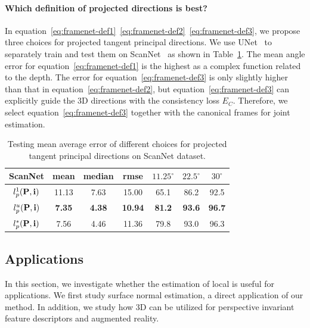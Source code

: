 \vspace{-0.1in}
\paragraph{Which definition of projected directions is best?}
In equation~\ref{eq:framenet-def1}~\ref{eq:framenet-def2}~\ref{eq:framenet-def3}, we propose three choices for projected tangent principal directions. We use UNet~\cite{ronneberger2015u} to separately train and test them on ScanNet~\cite{dai2017scannet} as shown in Table~\ref{tab:framenet-def}. The mean angle error for equation~\ref{eq:framenet-def1} is the highest as a complex function related to the depth. The error for equation~\ref{eq:framenet-def3} is only slightly higher than that in equation~\ref{eq:framenet-def2}, but equation~\ref{eq:framenet-def3} can explicitly guide the 3D directions with the consistency loss $E_C$. Therefore, we select equation~\ref{eq:framenet-def3} together with the canonical frames for joint estimation.

\begin{table}[t]
    \centering
    \tabcolsep=0.13cm
    \small
    \begin{tabular}{|c|c|c|c||c|c|c|}
        \hline
         \textbf{ScanNet} & mean & median & rmse & $11.25^\circ$ & $22.5^\circ$ & $30^\circ$\\
         \hline
         $l^1_p(\mathbf{P},\mathbf{i})$ & 11.13 & 7.63 & 15.00 & 65.1 & 86.2 & 92.5\\
         \hline
         $l^u_p(\mathbf{P},\mathbf{i})$ & \textbf{7.35} & \textbf{4.38} & \textbf{10.94} & \textbf{81.2} & \textbf{93.6} & \textbf{96.7}\\
         \hline
         $l^*_p(\mathbf{P},\mathbf{i})$ & 7.56 & 4.46 & 11.36 & 79.8 & 93.0 & 96.3\\
         \hline
    \end{tabular}
    \caption{Testing mean average error of different choices for projected tangent principal directions on ScanNet dataset.}
    \label{tab:framenet-def}
\end{table}

\subsection{Applications}
\label{sec:framenet-applications}

In this section, we investigate whether the estimation of local \cframe{} is useful for applications.   We first study surface normal estimation, a direct application of our method.   In addition, we study how 3D \cframe{} can be utilized for perspective invariant feature descriptors and augmented reality.

